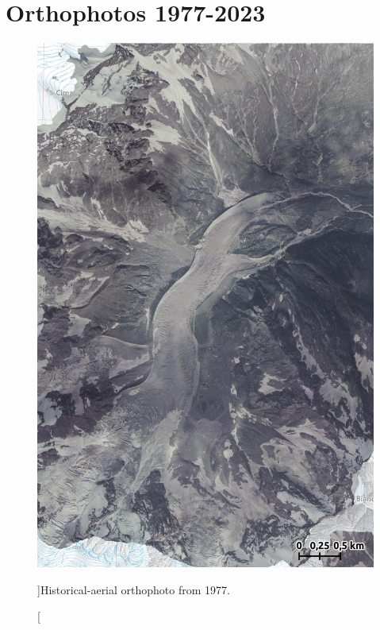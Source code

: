 \chapter{Orthophotos 1977-2023}\label{app:orthophotos}

\begin{figure}[p]
    \centering
    \includegraphics[height=\textheight]{figures/appendix/orto_1977.jpg}
    \caption[][]{Historical-aerial orthophoto from 1977.}
\end{figure}

